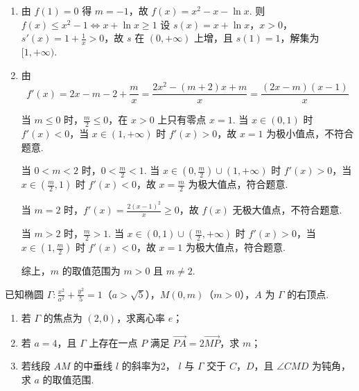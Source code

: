 \documentclass[UTF8,a4paper,oneside,11pt]{ctexbook}
\begin{document}
\begin{solution}
\begin{enumerate}
\item 由 \(f(1)=0\) 得 \(m=-1\)，故
\(f(x)=x^2-x-\ln x\).
则
\(
f(x)\le x^2-1\iff x+\ln x\ge1
\)
设 \(s(x)=x+\ln x\)，\(x>0\)，\(s'(x)=1+\frac1x>0\)，故 \(s\) 在 \((0,+\infty)\) 上增，且 \(s(1)=1\)，解集为 \([1,+\infty)\).

\item 由
\[
f'(x)=2x-m-2+\frac{m}{x}=\frac{2x^2-(m+2)x+m}{x}=\frac{\left(2x-m\right)\left(x-1\right)}{x}
\]

当 \(m\le0\) 时，\(\frac{m}{2}\le0\)，在 \(x>0\) 上只有零点 \(x=1\). 当 \(x\in(0,1)\) 时 \(f'(x)<0\)，当 \(x\in(1,+\infty)\) 时 \(f'(x)>0\)，故 \(x=1\) 为极小值点，不符合题意.

当 \(0<m<2\) 时，\(0<\frac{m}{2}<1\). 当 \(x\in\left(0,\frac{m}{2}\right)\cup(1,+\infty)\) 时 \(f'(x)>0\)，当 \(x\in\left(\frac{m}{2},1\right)\) 时 \(f'(x)<0\)，故 \(x=\frac{m}{2}\) 为极大值点，符合题意.

当 \(m=2\) 时，\(f'(x)=\frac{2\left(x-1\right)^2}{x}\ge0\)，故 \(f(x)\) 无极大值点，不符合题意.

当 \(m>2\) 时，\(\frac{m}{2}>1\). 当 \(x\in(0,1)\cup\left(\frac{m}{2},+\infty\right)\) 时 \(f'(x)>0\)，当 \(x\in\left(1,\frac{m}{2}\right)\) 时 \(f'(x)<0\)，故 \(x=1\) 为极大值点，符合题意.

综上，\(m\) 的取值范围为 \(m>0\) 且 \(m\ne2\).
\end{enumerate}
\end{solution}

\begin{problem}
已知椭圆 \(\Gamma:\frac{x^2}{a^2}+\frac{y^2}{5}=1\)（\(a>\sqrt5\)），\(M(0,m)\)（\(m>0\)），\(A\) 为 \(\Gamma\) 的右顶点.
\begin{enumerate}
\item 若 \(\Gamma\) 的焦点为 \((2,0)\)，求离心率 \(e\)；
\item 若 \(a=4\)，且 \(\Gamma\) 上存在一点 \(P\) 满足 \(\overrightarrow{PA}=2\overrightarrow{MP}\)，求 \(m\)；
\item 若线段 \(AM\) 的中垂线 \(l\) 的斜率为2， \(l\) 与 \(\Gamma\) 交于 \(C\)，\(D\)，且 \(\angle CMD\) 为钝角，求 \(a\) 的取值范围.
\end{enumerate}
\end{problem}
\end{document}
